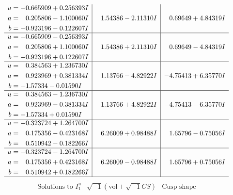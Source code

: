 \documentclass[1p]{elsarticle_modified}
\theoremstyle{definition}
\newcommand{\I}{\sqrt{-1}}
\begin{document}
$$\begin{array}{c|c|c}
\begin{aligned}
u &= -0.665909 + 0.256393 I \\
a &= \phantom{-}0.205806 - 1.100060 I \\
b &= -0.923196 - 0.122607 I\end{aligned}
 & \phantom{-}1.54386 - 2.11310 I & \phantom{-}0.69649 + 4.84319 I \\ \hline\begin{aligned}
u &= -0.665909 - 0.256393 I \\
a &= \phantom{-}0.205806 + 1.100060 I \\
b &= -0.923196 + 0.122607 I\end{aligned}
 & \phantom{-}1.54386 + 2.11310 I & \phantom{-}0.69649 - 4.84319 I \\ \hline\begin{aligned}
u &= \phantom{-}0.384563 + 1.236730 I \\
a &= \phantom{-}0.923969 + 0.381334 I \\
b &= -1.57334 - 0.01590 I\end{aligned}
 & \phantom{-}1.13766 - 4.82922 I & -4.75413 + 6.35770 I \\ \hline\begin{aligned}
u &= \phantom{-}0.384563 - 1.236730 I \\
a &= \phantom{-}0.923969 - 0.381334 I \\
b &= -1.57334 + 0.01590 I\end{aligned}
 & \phantom{-}1.13766 + 4.82922 I & -4.75413 - 6.35770 I \\ \hline\begin{aligned}
u &= -0.323724 + 1.264700 I \\
a &= \phantom{-}0.175356 - 0.423168 I \\
b &= \phantom{-}0.510942 - 0.182266 I\end{aligned}
 & \phantom{-}6.26009 + 0.98488 I & \phantom{-}1.65796 - 0.75056 I \\ \hline\begin{aligned}
u &= -0.323724 - 1.264700 I \\
a &= \phantom{-}0.175356 + 0.423168 I \\
b &= \phantom{-}0.510942 + 0.182266 I\end{aligned}
 & \phantom{-}6.26009 - 0.98488 I & \phantom{-}1.65796 + 0.75056 I\\
 \hline 
 \end{array}$$\newpage$$\begin{array}{c|c|c}  
\text{Solutions to }I^u_{1}& \I (\text{vol} + \sqrt{-1}CS) & \text{Cusp shape}\\

\end{array}$$
\end{document}
